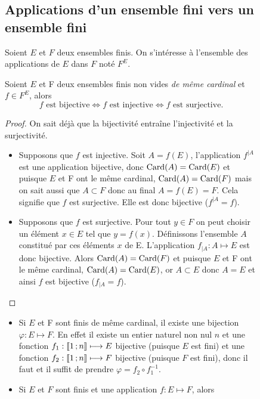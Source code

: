 \begin{figure}
\subsection{Applications d'un ensemble fini vers un ensemble fini}
Soient \(E\) et \(F\) deux ensembles finis. On s'intéresse à l'ensemble des applications de \(E\) dans \(F\) noté \(F^E\).
\begin{theo}\label{theo:bijinjsurj}
  Soient \(E\) et F deux ensembles finis non vides \emph{de même cardinal} et \(f\in F^E\), alors
  \begin{equation}
    f \text{~est bijective}\iff f \text{~est injective}\iff f \text{~est surjective}.
  \end{equation}
\end{theo}
\begin{proof}
  On sait déjà que la bijectivité entraîne l'injectivité et la surjectivité.
  \begin{itemize}
  \item Supposons que \(f\) est injective. Soit \(A=f(E)\), l'application \(f^{|A}\) est une application bijective, donc \(\operatorname{Card}(A)=\operatorname{Card}(E)\) et puisque \(E\) et F ont le même cardinal, \(\operatorname{Card}(A)=\operatorname{Card}(F)\) mais on sait aussi que \(A\subset F\) donc au final \(A=f(E)=F\). Cela signifie que \(f\) est surjective. Elle est donc bijective (\(f^{|A}=f\)).
  \item Supposons que \(f\) est surjective. Pour tout \(y\in F\) on peut choisir un élément \(x\in E\) tel que \(y=f(x)\). Définissons l'ensemble \(A\) constitué par ces éléments \(x\) de E. L'application \(f_{|A}:A\longmapsto E\) est donc bijective. Alors \(\operatorname{Card}(A)=\operatorname{Card}(F)\) et puisque \(E\) et F ont le même cardinal, \(\operatorname{Card}(A)=\operatorname{Card}(E)\), or \(A\subset E\) donc \(A=E\) et ainsi \(f\) est bijective (\(f_{|A}=f\)).
  \end{itemize}
\end{proof}
\begin{itemize}
\item Si \(E\) et F sont finis de même cardinal, il existe une bijection \(\varphi:E\longmapsto F\). En effet il existe un entier naturel non nul \(n\) et une fonction \(f_1:\mathopen{\llbracket}1\mathclose{}\mathpunct{};n\mathclose{\rrbracket} \longmapsto E\) bijective (puisque \(E\) est fini) et une fonction \(f_2:\mathopen{\llbracket}1\mathclose{}\mathpunct{};n\mathclose{\rrbracket} \longmapsto F\) bijective (puisque \(F\) est fini), donc il faut et il suffit de prendre \(\varphi=f_2\circ f_1^{-1}\).
\item Si \(E\) et \(F\) sont finis et une application \(f:E\longmapsto F\), alors
  \begin{gather}

\end{gather}
\end{itemize}
\end{figure}
